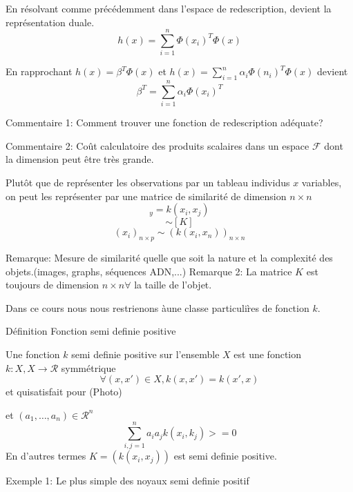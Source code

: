 \documentclass{article}
\begin{document}
En r\'esolvant comme pr\'ec\'edemment dans l'espace de redescription, devient la repr\'esentation duale.
\begin{equation}
h(x)=\sum_{i=1}^n\Phi(x_i)^T\Phi(x)
\end{equation}

En rapprochant $h(x)=\beta^T\Phi(x)$ et $h(x)=\sum_{i=1}^n\alpha_i\Phi(n_i)^T\Phi(x)$
devient 
\begin{equation}
\beta^T=\sum_{i=1}^n\alpha_i\Phi(x_i)^T
\end{equation}

Commentaire 1: Comment trouver une fonction de redescription ad\'equate?

Commentaire 2: Co\^{u}t calculatoire des produits scalaires dans un espace $\mathcal{F}$ dont la dimension peut \^etre tr\`es grande.

Plut\^ot que de repr\'esenter les observations par un tableau individus $x$ variables, on peut les repr\'esenter par une matrice de similarit\'e de dimension $n\times n$
\begin{equation}
[K]_y=k(x_i,x_j)
\end{equation}
\begin{equation}
[X]\sim [K]
\end{equation}
\begin{equation}
(x_i)_{n\times p}\sim (k(x_i,x_n))_{n\times n}
\end{equation}

Remarque: Mesure de similarit\'e quelle que soit la nature et la complexit\'e des objets.(images, graphs, s\'equences ADN,...)
Remarque 2: La matrice $K$ est toujours de dimension $n\times n \forall$ la taille de l'objet.

Dans ce cours nous nous restrienons \`aune classe particuli\`res de fonction $k$.

D\'efinition Fonction semi definie positive

Une fonction $k$ semi definie positive sur l'ensemble $X$ est une fonction $k:X,X\to \mathcal{R}$ symm\'etrique 
\begin{equation}
\forall (x,x')\in X, k(x,x')=k(x',x)
\end{equation}
et quisatisfait pour 
(Photo)

et $(a_1,\ldots,a_n)\in\mathcal{R}^n$
\begin{equation}
\sum_{i,j=1}^na_ia_jk(x_i,k_j)>=0
\end{equation}
En d'autres termes $K=(k(x_i,x_j))$ est semi definie positive.

Exemple 1: Le plus simple des noyaux semi definie positif
\end{document}
